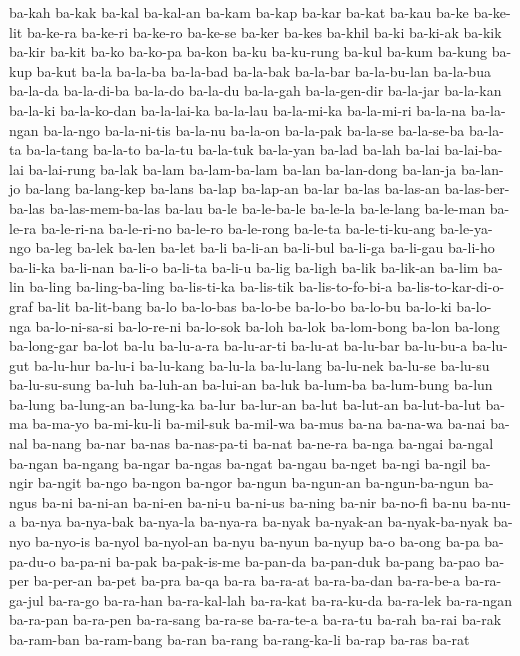 {ba-kah ba-kak ba-kal ba-kal-an ba-kam ba-kap ba-kar ba-kat ba-kau ba-ke
ba-ke-lit ba-ke-ra ba-ke-ri ba-ke-ro ba-ke-se ba-ker ba-kes ba-khil ba-ki
ba-ki-ak ba-kik ba-kir ba-kit ba-ko ba-ko-pa ba-kon ba-ku ba-ku-rung
ba-kul ba-kum ba-kung ba-kup ba-kut ba-la ba-la-ba ba-la-bad ba-la-bak
ba-la-bar ba-la-bu-lan ba-la-bua ba-la-da ba-la-di-ba ba-la-do ba-la-du
ba-la-gah ba-la-gen-dir ba-la-jar ba-la-kan ba-la-ki ba-la-ko-dan
ba-la-lai-ka ba-la-lau ba-la-mi-ka ba-la-mi-ri ba-la-na ba-la-ngan
ba-la-ngo ba-la-ni-tis ba-la-nu ba-la-on ba-la-pak ba-la-se ba-la-se-ba
ba-la-ta ba-la-tang ba-la-to ba-la-tu ba-la-tuk ba-la-yan ba-lad ba-lah
ba-lai ba-lai-ba-lai ba-lai-rung ba-lak ba-lam ba-lam-ba-lam ba-lan
ba-lan-dong ba-lan-ja ba-lan-jo ba-lang ba-lang-kep ba-lans ba-lap
ba-lap-an ba-lar ba-las ba-las-an ba-las-ber-ba-las ba-las-mem-ba-las
ba-lau ba-le ba-le-ba-le ba-le-la ba-le-lang ba-le-man ba-le-ra
ba-le-ri-na ba-le-ri-no ba-le-ro ba-le-rong ba-le-ta ba-le-ti-ku-ang
ba-le-ya-ngo ba-leg ba-lek ba-len ba-let ba-li ba-li-an ba-li-bul ba-li-ga
ba-li-gau ba-li-ho ba-li-ka ba-li-nan ba-li-o ba-li-ta ba-li-u ba-lig
ba-ligh ba-lik ba-lik-an ba-lim ba-lin ba-ling ba-ling-ba-ling
ba-lis-ti-ka ba-lis-tik ba-lis-to-fo-bi-a ba-lis-to-kar-di-o-graf ba-lit
ba-lit-bang ba-lo ba-lo-bas ba-lo-be ba-lo-bo ba-lo-bu ba-lo-ki ba-lo-nga
ba-lo-ni-sa-si ba-lo-re-ni ba-lo-sok ba-loh ba-lok ba-lom-bong ba-lon
ba-long ba-long-gar ba-lot ba-lu ba-lu-a-ra ba-lu-ar-ti ba-lu-at ba-lu-bar
ba-lu-bu-a ba-lu-gut ba-lu-hur ba-lu-i ba-lu-kang ba-lu-la ba-lu-lang
ba-lu-nek ba-lu-se ba-lu-su ba-lu-su-sung ba-luh ba-luh-an ba-lui-an
ba-luk ba-lum-ba ba-lum-bung ba-lun ba-lung ba-lung-an ba-lung-ka ba-lur
ba-lur-an ba-lut ba-lut-an ba-lut-ba-lut ba-ma ba-ma-yo ba-mi-ku-li
ba-mil-suk ba-mil-wa ba-mus ba-na ba-na-wa ba-nai ba-nal ba-nang ba-nar
ba-nas ba-nas-pa-ti ba-nat ba-ne-ra ba-nga ba-ngai ba-ngal ba-ngan
ba-ngang ba-ngar ba-ngas ba-ngat ba-ngau ba-nget ba-ngi ba-ngil ba-ngir
ba-ngit ba-ngo ba-ngon ba-ngor ba-ngun ba-ngun-an ba-ngun-ba-ngun ba-ngus
ba-ni ba-ni-an ba-ni-en ba-ni-u ba-ni-us ba-ning ba-nir ba-no-fi ba-nu
ba-nu-a ba-nya ba-nya-bak ba-nya-la ba-nya-ra ba-nyak ba-nyak-an
ba-nyak-ba-nyak ba-nyo ba-nyo-is ba-nyol ba-nyol-an ba-nyu ba-nyun ba-nyup
ba-o ba-ong ba-pa ba-pa-du-o ba-pa-ni ba-pak ba-pak-is-me ba-pan-da
ba-pan-duk ba-pang ba-pao ba-per ba-per-an ba-pet ba-pra ba-qa ba-ra
ba-ra-at ba-ra-ba-dan ba-ra-be-a ba-ra-ga-jul ba-ra-go ba-ra-han
ba-ra-kal-lah ba-ra-kat ba-ra-ku-da ba-ra-lek ba-ra-ngan ba-ra-pan
ba-ra-pen ba-ra-sang ba-ra-se ba-ra-te-a ba-ra-tu ba-rah ba-rai ba-rak
ba-ram-ban ba-ram-bang ba-ran ba-rang ba-rang-ka-li ba-rap ba-ras ba-rat
}
